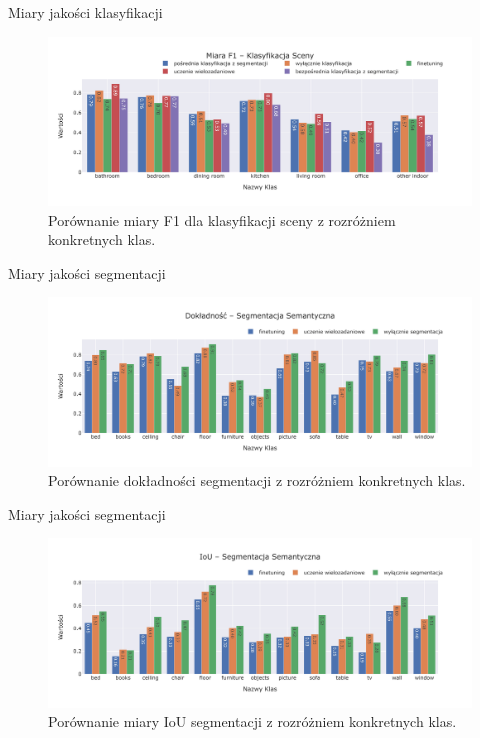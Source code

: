 \documentclass[10pt]{beamer}
\begin{document}
\begin{frame}{Miary jakości klasyfikacji}
    
    \begin{figure}[ht!]
        \centering
        \includegraphics[width=\textwidth]{images/pl-res/Miara-F1-Klasyfikacja-Sceny.jpeg}
        \caption{Porównanie miary F1 dla klasyfikacji sceny z rozróżniem konkretnych klas.}
        \label{fig:classification-f1}
    \end{figure}
\end{frame}

\begin{frame}{Miary jakości segmentacji}
    
    \begin{figure}[ht!]
        \centering
        \includegraphics[width=\textwidth]{images/pl-res/Dokladnosc-Segmentacja-Semantyczna.jpeg}
        \caption{Porównanie dokładności segmentacji z rozróżniem konkretnych klas.}
        \label{fig:segmentation-acc}
    \end{figure}
\end{frame}


\begin{frame}{Miary jakości segmentacji}
    
    \begin{figure}[ht!]
        \centering
        \includegraphics[width=\textwidth]{images/pl-res/IoU-Segmentacja-Semantyczna.jpeg}
        \caption{Porównanie miary IoU segmentacji z rozróżniem konkretnych klas.}
        \label{fig:segmentation-iou}
        
    \end{figure}
\end{frame}
\end{document}
